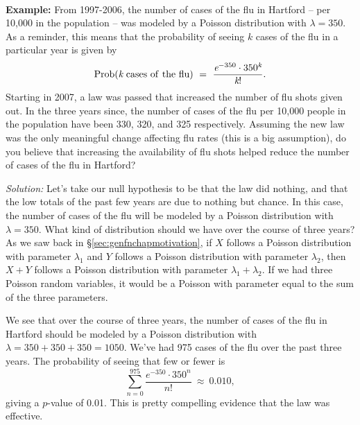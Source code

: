 \ \\

\textbf{Example:} \ex From 1997-2006, the number of cases of the flu in Hartford -- per 10,000 in the population -- was modeled by a Poisson distribution with $\lambda = 350$.  As a reminder, this means that the probability of seeing $k$ cases of the flu in a particular year is given by
\begin{equation*}
\rm{Prob}(\emph{k} \ cases \ of \ the \ flu) \ = \  \frac{\emph{e}^{-350}\cdot 350^\emph{k}}{\emph{k}!}.
\end{equation*}
Starting in 2007, a law was passed that increased the number of flu shots given out.  In the three years since, the number of cases of the flu per 10,000 people in the population have been 330, 320, and 325 respectively.  Assuming the new law was the only meaningful change affecting flu rates (this is a big assumption), do you believe that increasing the availability of flu shots helped reduce the number of cases of the flu in Hartford?

\emph{Solution:} Let's take our null hypothesis to be that the law did nothing, and that the low totals of the past few years are due to nothing but chance.  In this case, the number of cases of the flu will be modeled by a Poisson distribution with $\lambda = 350$. What kind of distribution should we have over the course of three years?  As we saw back in \S\ref{sec:genfnchapmotivation}, if $X$ follows a Poisson distribution with parameter $\lambda_1$ and $Y$ follows a Poisson distribution with parameter $\lambda_2$, then $X+Y$ follows a Poisson distribution with parameter $\lambda_1 + \lambda_2$. If we had three Poisson random variables, it would be a Poisson with parameter equal to the sum of the three parameters.

We see that over the course of three years, the number of cases of the flu in Hartford should be modeled by a Poisson distribution with $\lambda = 350 + 350 + 350 = 1050$.  We've had 975 cases of the flu over the past three years.  The probability of seeing that few or fewer is
\begin{equation*}
  \sum_{n=0}^{975}{\frac{e^{-350}\cdot350^n}{n!}}\ \approx \  0.010,
	\end{equation*}
giving a $p$-value of 0.01.  This is pretty compelling evidence that the law was effective.

\ \\


